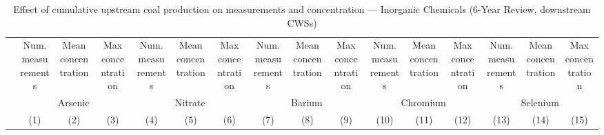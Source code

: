 
\begin{table}[htbp]
   
   \caption{\label{tab:6yr_huc02fe_cnt_inorg} Effect of cumulative upstream coal production on measurements and concentration --- Inorganic Chemicals (6-Year Review, downstream CWSs)}
   \bigskip
   
   \centering
   
   \begin{adjustbox}{width = \textwidth, center}
      
      
      \begin{tabular}{lccccccccccccccc}
         \toprule
         
                                             & Num. measurements & Mean concentration & Max concentration & Num. measurements & Mean concentration & Max concentration & Num. measurements & Mean concentration & Max concentration & Num. measurements & Mean concentration & Max concentration & Num. measurements & Mean concentration & Max concentration\\  
         
          & \multicolumn{3}{c}{Arsenic} & \multicolumn{3}{c}{Nitrate} & \multicolumn{3}{c}{Barium} & \multicolumn{3}{c}{Chromium} & \multicolumn{3}{c}{Selenium} \\ 
         
                                             & (1)               & (2)                & (3)               & (4)               & (5)                & (6)               & (7)               & (8)                & (9)               & (10)              & (11)               & (12)              & (13)              & (14)               & (15)\\  
         

\end{tabular}
\end{adjustbox}
\end{table}
